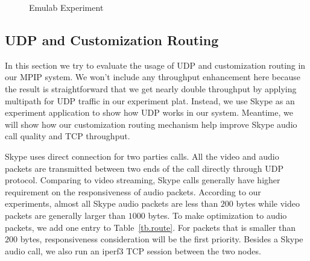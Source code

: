 \begin{figure}[htb]
\caption{Emulab Experiment}
\label{fig.emulab}
\end{figure}


\subsection{UDP and Customization Routing}
\label{sec:udp}

In this section we try to evaluate the usage of UDP and customization routing in our MPIP system. We won't include any throughput enhancement here because the result is straightforward that we get nearly double throughput by applying multipath for UDP traffic in our experiment plat. Instead, we use Skype\cite{skype} as an experiment application to show how UDP works in our system. Meantime, we will show how our customization routing mechanism help improve Skype audio call quality and TCP throughput.

Skype uses direct connection for two parties calls. All the video and audio packets are transmitted between two ends of the call directly through UDP protocol. Comparing to video streaming, Skype calls generally have higher requirement on the responsiveness of audio packets. According to our experiments, almost all Skype audio packets are less than $200$ bytes while video packets are generally larger than $1000$ bytes. To make optimization to audio packets, we add one entry to Table~\ref{tb.route}. For packets that is smaller than $200$ bytes, responsiveness consideration will be the first priority. Besides a Skype audio call, we also run an iperf3 TCP session between the two nodes.

